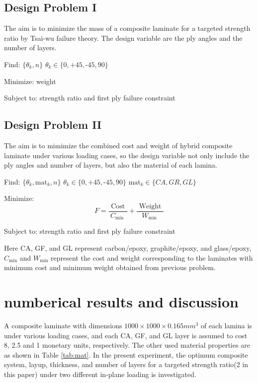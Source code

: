 \documentclass[Afour,sageh,times]{sagej}
\begin{document}
\subsection{Design Problem I}

The aim is to minimize the mass of a composite laminate for a targeted strength
ratio by Tsai-wu failure theory. The design variable are the ply angles and the
number of layers.

Find: $\{\theta_k, n\}$ $\theta_k \in \{ 0,\text{+}45,\text{-}45,90\}$ 

Minimize: weight

Subject to: strength ratio and first ply failure constraint


\subsection{Design Problem II}
The aim is to mimimize the combined cost and weight of hybrid composite
laminate under various loading cases, so the design variable not only include
the ply angles and number of layers, but also the material of each lamina. 


Find: $\{\theta_k,\text{mat}_k, n\}$ $\theta_k \in \{ 0,\text{+}45,\text{-}45,90\}$ $\text{mat}_k \in \{CA, GR, GL \}$

Minimize: 
\begin{equation}
	F=\frac{\text { Cost }}{C_{\text {min }}}+\frac{\text { Weight }}{W_{\text {min }}}
\end{equation}

Subject to: strength ratio and first ply failure constraint


Here CA, GF, and GL represent carbon/epoxy, graphite/epoxy, and glass/epoxy,
 $C_{\text{min}}$ and $W_{\text{min}}$ represent the cost and
weight corresponding to the laminates with minimum cost and minimum weight
obtained from previous problem.

\section{numberical results and discussion}
A composite laminate with dimensions $1000 \times 1000 \times 0.165 mm^3$ of
each lamina is under various loading cases, and each CA, GF, and GL layer is
assumed to cost 8, 2.5 and 1 monetary units, respectively.  The other used
material properties are as shown in Table \ref{tab:mat}.  In the present
experiment,  the optimum composite system, layup, thickness, and number of
layers for a targeted strength ratio(2 in this paper) under two different
in-plane loading is investigated.
\end{document}

